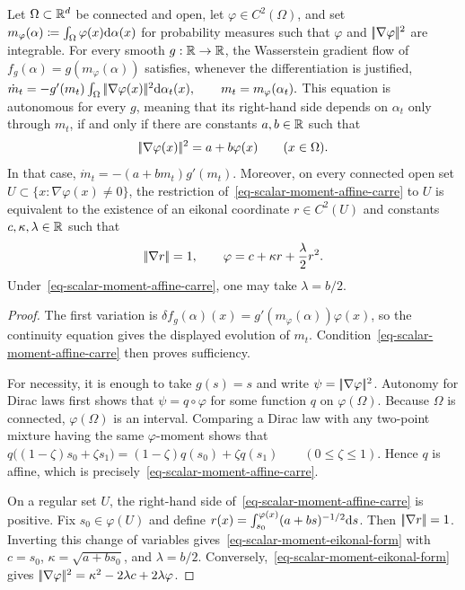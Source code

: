 \begin{prop}\label{prop-scalar-moment-closure}
Let $\Omega\subset\mathbb{R}^d$ be connected and open, let $\varphi\in C^2(\Omega)$, and set
\(m_\varphi(\alpha)\coloneqq\int_\Omega\varphi(x)\mathrm{d}\alpha(x)\)
for probability measures such that $\varphi$ and $|\!| \nabla\varphi |\!|^2$ are integrable. For every smooth $g:\mathbb{R}\to\mathbb{R}$, the Wasserstein gradient flow of $f_g(\alpha)=g(m_\varphi(\alpha))$ satisfies, whenever the differentiation is justified,
\(\dot m_t = -g'(m_t)\int_\Omega|\!| \nabla\varphi(x) |\!|^2\mathrm{d}\alpha_t(x), \qquad m_t=m_\varphi(\alpha_t).\)
This equation is autonomous for every $g$, meaning that its right-hand side depends on $\alpha_t$ only through $m_t$, if and only if there are constants $a,b\in\mathbb{R}$ such that
\begin{equation}\label{eq-scalar-moment-affine-carre}
|\!| \nabla\varphi(x) |\!|^2=a+b\varphi(x)
\qquad (x\in\Omega).
\end{equation}
In that case, $\dot m_t=-(a+b m_t)g'(m_t)$.
Moreover, on every connected open set $U\subset\{x:\nabla\varphi(x)\neq0\}$, the restriction of~\eqref{eq-scalar-moment-affine-carre} to $U$ is equivalent to the existence of an eikonal coordinate $r\in C^2(U)$ and constants $c,\kappa,\lambda\in\mathbb{R}$ such that
\begin{equation}\label{eq-scalar-moment-eikonal-form}
|\!| \nabla r |\!|=1,
\qquad
\varphi=c+\kappa r+\frac{\lambda}{2}r^2.
\end{equation}
Under~\eqref{eq-scalar-moment-affine-carre}, one may take $\lambda=b/2$.
\end{prop}
\begin{proof}
The first variation is $\delta f_g(\alpha)(x)=g'(m_\varphi(\alpha))\varphi(x)$, so the continuity equation gives the displayed evolution of $m_t$. Condition~\eqref{eq-scalar-moment-affine-carre} then proves sufficiency.

For necessity, it is enough to take $g(s)=s$ and write $\psi=|\!| \nabla\varphi |\!|^2$. Autonomy for Dirac laws first shows that $\psi=q\circ\varphi$ for some function $q$ on $\varphi(\Omega)$. Because $\Omega$ is connected, $\varphi(\Omega)$ is an interval. Comparing a Dirac law with any two-point mixture having the same $\varphi$-moment shows that
\(q\bigl((1-\zeta)s_0+\zeta s_1\bigr) = (1-\zeta)q(s_0)+\zeta q(s_1) \qquad (0\leq\zeta\leq1).\)
Hence $q$ is affine, which is precisely~\eqref{eq-scalar-moment-affine-carre}.

On a regular set $U$, the right-hand side of~\eqref{eq-scalar-moment-affine-carre} is positive. Fix $s_0\in\varphi(U)$ and define $r(x)=\int_{s_0}^{\varphi(x)}(a+bs)^{-1/2}\mathrm{d} s$.
Then $|\!| \nabla r |\!|=1$. Inverting this change of variables gives~\eqref{eq-scalar-moment-eikonal-form} with $c=s_0$, $\kappa=\sqrt{a+bs_0}$, and $\lambda=b/2$. Conversely,~\eqref{eq-scalar-moment-eikonal-form} gives
$|\!| \nabla\varphi |\!|^2=\kappa^2-2\lambda c+2\lambda\varphi$.
\end{proof}
